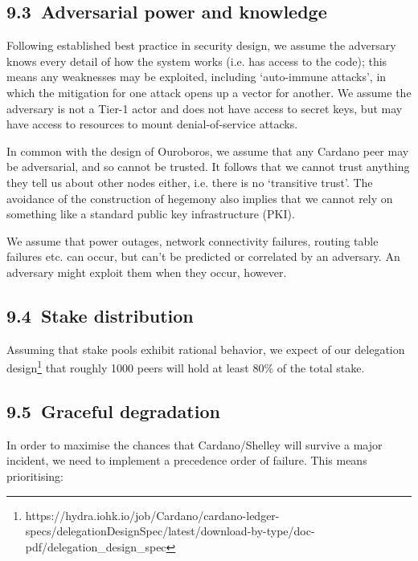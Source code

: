 \documentclass[11pt,a4paper]{article}
\begin{document}
\hypertarget{adversarial-power-and-knowledge}{%
\subsection{​9.3​~Adversarial power and
knowledge}\label{adversarial-power-and-knowledge}}

Following established best practice in security design, we assume the
adversary knows every detail of how the system works (i.e. has access to
the code); this means any weaknesses may be exploited, including
`auto-immune attacks', in which the mitigation for one attack opens up a
vector for another. We assume the adversary is not a Tier-1 actor and
does not have access to secret keys, but may have access to resources to
mount denial-of-service attacks.

In common with the design of Ouroboros, we assume that any Cardano peer
may be adversarial, and so cannot be trusted. It follows that we cannot
trust anything they tell us about other nodes either, i.e. there is no
`transitive trust'. The avoidance of the construction of hegemony also
implies that we cannot rely on something like a standard public key
infrastructure (PKI).

We assume that power outages, network connectivity failures, routing
table failures etc. can occur, but can't be predicted or correlated by
an adversary. An adversary might exploit them when they occur, however.

\hypertarget{stake-distribution}{%
\subsection{​9.4​~Stake distribution}\label{stake-distribution}}

Assuming that stake pools exhibit rational behavior, we expect of our
delegation design\footnote{https://hydra.iohk.io/job/Cardano/cardano-ledger-specs/delegationDesignSpec/latest/download-by-type/doc-pdf/delegation\_design\_spec}
that roughly {1000 peers} will hold at least 80\% of the total stake.

\hypertarget{graceful-degradation}{%
\subsection{​9.5​~Graceful degradation}\label{graceful-degradation}}

In order to maximise the chances that Cardano/Shelley will survive a
major incident, we need to implement a precedence order of failure. This
means prioritising:
\end{document}
